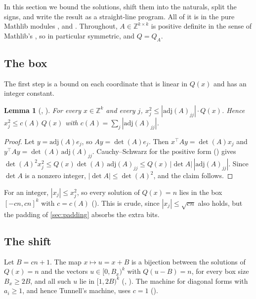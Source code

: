 \documentclass[10pt]{amsart}
\theoremstyle{plain}
\newtheorem{lemma}[theorem]{Lemma}
\theoremstyle{definition}
\theoremstyle{remark}
\numberwithin{equation}{section}
\newcommand{\Z}{\mathbb{Z}}
\begin{document}
In this section we bound the solutions, shift them into the naturals, split the signs, and write the
result as a straight-line program. All of it is in the pure Mathlib modules , 
and . Throughout, $A\in\Z^{k\times k}$ is positive definite in the sense of Mathlib's
, so in particular symmetric, and $Q=Q_A$.

\subsection{The box}
The first step is a bound on each coordinate that is linear in $Q(x)$ and has an integer constant.

\begin{lemma}[, ]\label{lem:box}
For every $x\in\Z^k$ and every $j$, $x_j^2\le|\mathrm{adj}(A)_{jj}|\cdot Q(x)$. Hence $x_j^2\le c(A)\,Q(x)$
with $c(A)=\sum_j|\mathrm{adj}(A)_{jj}|$.
\end{lemma}

\begin{proof}
Let $y=\mathrm{adj}(A)e_j$, so $Ay=\det(A)e_j$. Then $x^{\top}Ay=\det(A)x_j$ and
$y^{\top}Ay=\det(A)\,\mathrm{adj}(A)_{jj}$. Cauchy--Schwarz for the positive form () gives
$\det(A)^2x_j^2\le Q(x)\det(A)\,\mathrm{adj}(A)_{jj}\le Q(x)\,|\det A|\,|\mathrm{adj}(A)_{jj}|$. Since
$\det A$ is a nonzero integer, $|\det A|\le\det(A)^2$, and the claim follows.
\end{proof}

\noindent For an integer, $|x_j|\le x_j^2$, so every solution of $Q(x)=n$ lies in the box $[-cn,cn]^k$ with
$c=c(A)$ (). This is crude, since $|x_j|\le\sqrt{cn}$ also holds, but the padding of
\cref{sec:padding} absorbs the extra bits.

\subsection{The shift}
Let $B=cn+1$. The map $x\mapsto u=x+B$ is a bijection between the solutions of $Q(x)=n$ and the vectors
$u\in[0,B_x)^k$ with $Q(u-B)=n$, for every box size $B_x\ge2B$, and all such $u$ lie in $[1,2B)^k$
(, ). The machine for diagonal forms with $a_i\ge1$, and hence
Tunnell's machine, uses $c=1$ ().
\end{document}
